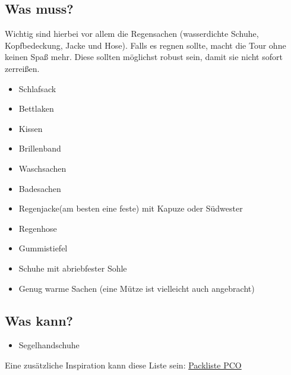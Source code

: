 \documentclass[12pt]{article}
\begin{document}
\subsection*{Was muss?}
Wichtig sind hierbei vor allem die Regensachen (wasserdichte Schuhe, Kopfbedeckung, Jacke und Hose). Falls es regnen sollte, macht die Tour ohne keinen Spaß mehr. Diese sollten möglichst robust sein, damit sie nicht sofort zerreißen.
\begin{itemize}
\renewcommand{\labelitemi}{$\boxempty$}
\item Schlafsack
\item Bettlaken
\item Kissen
\item Brillenband
\item Waschsachen
\item Badesachen
\item Regenjacke(am besten eine feste) mit Kapuze oder Südwester
\item Regenhose
\item Gummistiefel
\item Schuhe mit abriebfester Sohle
\item Genug warme Sachen (eine Mütze ist vielleicht auch angebracht)
\end{itemize}

\subsection*{Was kann?}
\begin{itemize}
\renewcommand{\labelitemi}{$\boxempty$}
\item Segelhandschuhe

\end{itemize}

Eine zusätzliche Inspiration kann diese Liste sein: \href{http://www.pc-ostsee.de/yachtcharter/sites/download/Packliste.pdf}{Packliste PCO}
\end{document}
